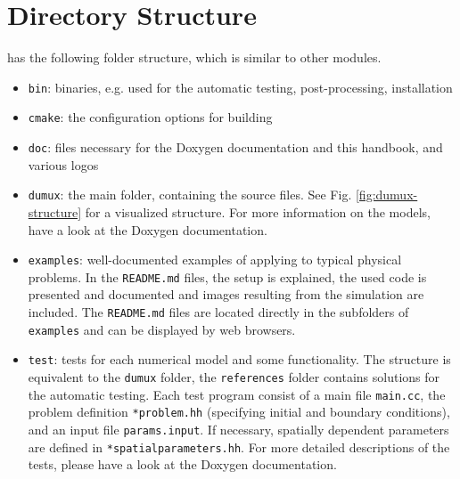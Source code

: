 \section{Directory Structure}
\label{sc_structure}

\Dumux has the following folder structure, which is similar to other \Dune modules.
\begin{itemize}
\item \texttt{bin}: binaries, e.g. used for the automatic testing, post-processing, installation
\item \texttt{cmake}: the configuration options for building \Dumux
\item \texttt{doc}: files necessary for the Doxygen documentation and this handbook, and various logos
\item \texttt{dumux}: the main folder, containing the source files. See Fig. \ref{fig:dumux-structure}
      for a visualized structure. For more information on the models, have a look at the
      Doxygen documentation.
\item \texttt{examples}: well-documented examples of applying \Dumux to typical physical problems. In the \texttt{README.md} files, the setup is explained, the used code is presented and documented and images resulting from the simulation are included. The \texttt{README.md} files are located directly in the subfolders of \texttt{examples} and can be displayed by web browsers.
\item \texttt{test}: tests for each numerical model and some functionality.
      The structure is equivalent to the \texttt{dumux} folder, the \texttt{references} folder
      contains solutions for the automatic testing. Each test program consist of a main file
      \texttt{main.cc}, the problem definition \texttt{*problem.hh} (specifying initial and boundary
      conditions), and an input file \texttt{params.input}.
      If necessary, spatially dependent parameters are defined in \texttt{*spatialparameters.hh}.
      For more detailed descriptions of the tests, please have a look at the Doxygen documentation.
\end{itemize}

